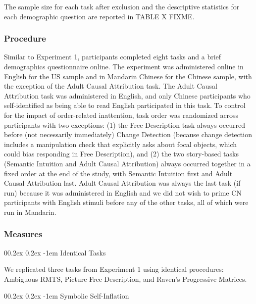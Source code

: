 \documentclass[
  man]{apa6}
\makeatletter
\let\oldparagraph\paragraph
\renewcommand{\paragraph}[1]{\oldparagraph{#1}\mbox{}}
\renewcommand{\paragraph}{\@startsection{paragraph}{4}{\parindent}%
  {0\baselineskip \@plus 0.2ex \@minus 0.2ex}%
  {-1em}%
  {\normalfont\normalsize\bfseries\itshape\typesectitle}}
\makeatother
\begin{document}
The sample size for each task after exclusion and the descriptive statistics for each demographic question are reported in TABLE X FIXME.

\hypertarget{procedure-1}{%
\subsubsection{Procedure}\label{procedure-1}}

Similar to Experiment 1, participants completed eight tasks and a brief demographics questionnaire online. The experiment was administered online in English for the US sample and in Mandarin Chinese for the Chinese sample, with the exception of the Adult Causal Attribution task. The Adult Causal Attribution task was administered in English, and only Chinese participants who self-identified as being able to read English participated in this task. To control for the impact of order-related inattention, task order was randomized across participants with two exceptions: (1) the Free Description task always occurred before (not necessarily immediately) Change Detection (because change detection includes a manipulation check that explicitly asks about focal objects, which could bias responding in Free Description), and (2) the two story-based tasks (Semantic Intuition and Adult Causal Attribution) always occurred together in a fixed order at the end of the study, with Semantic Intuition first and Adult Causal Attribution last. Adult Causal Attribution was always the last task (if run) because it was administered in English and we did not wish to prime CN participants with English stimuli before any of the other tasks, all of which were run in Mandarin.

\hypertarget{measures-1}{%
\subsubsection{Measures}\label{measures-1}}

\hypertarget{identical-tasks}{%
\paragraph{Identical Tasks}\label{identical-tasks}}

We replicated three tasks from Experiment 1 using identical procedures: Ambiguous RMTS, Picture Free Description, and Raven's Progressive Matrices.

\hypertarget{symbolic-self-inflation-2}{%
\paragraph{Symbolic Self-Inflation}\label{symbolic-self-inflation-2}}
\end{document}
